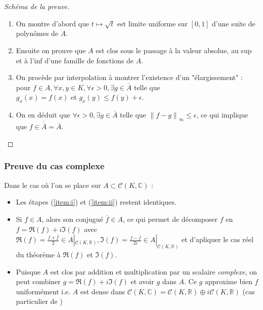 \documentclass[
	10pt, %
	xcolor={svgnames}
]{beamer}
\begin{document}
\begin{frame}
\begin{proof}[Schéma de la preuve]
	\begin{enumerate}
	\item On montre d'abord que \( t \mapsto \sqrt{t} \) est limite uniforme sur \( [0,1] \) d'une suite de polynômes de \( A \). \label{item:i}
		\item Ensuite on prouve que \( A \) est clos sous le passage à la valeur absolue, au sup et à l'inf d'une famille de fonctions de \( A \). \label{item:ii}
		\item On procède par interpolation à montrer l'existence d'un "élargissement" : pour \( f \in A, \forall x,y \in K, \forall \epsilon > 0, \exists g \in \overline{A} \) telle que \\\( g_{x}(x) = f(x) \) et \( g_{x}(y) \leq f(y) + \epsilon \). \label{item:iii}
		\item On en déduit que \( \forall\epsilon > 0, \exists g \in \overline{A} \) telle que \( {\left\lVert f-g \right\rVert_{\infty}} \le \epsilon \), ce qui implique que \( f \in \overline{\overline{A}} = \overline{A} \). \label{item:iv}
	\end{enumerate}	
\end{proof}
\end{frame}


\begin{frame}
	\frametitle{Preuve du cas complexe}
\par Dans le cas où l'on se place sur \( A \subset \mathcal{C}(K,\mathbb{C}) \) :
\begin{itemize}
	\item Les étapes (\ref{item:i}) et (\ref{item:ii}) restent identiques.
	\item Si \( f \in A \), alors son conjugué \( \overline{f} \in A \), ce qui permet de décomposer \( f \) en \( f = \Re(f) + i\Im(f) \) avec \( \Re(f) = \frac{f + \overline{f}}{2}\in A|_{\mathcal{C}(K,\mathbb{R})}, \Im(f) = \frac{f - \overline{f}}{2i} \in A|_{\mathcal{C}(K,\mathbb{R})} \) et d'apliquer le cas réel du théorème à \( \Re(f) \) et \( \Im(f) \).
	\item Puisque \( A \) est clos par addition et multiplication par un scalaire \textit{complexe}, on peut combiner \( g = \Re(f) + i\Im(f) \) et avoir \( g \) dans \( A \). Ce \( g \) approxime bien \( f \) uniformément i.e. \( A \) est dense dans \( \mathcal{C}(K,\mathbb{C}) = \mathcal{C}(K,\mathbb{R}) \oplus i\mathcal{C}(K,\mathbb{R}) \) (cas particulier de \cite{stephenson1968spaces})

\end{itemize}
\end{frame}
\end{document}
